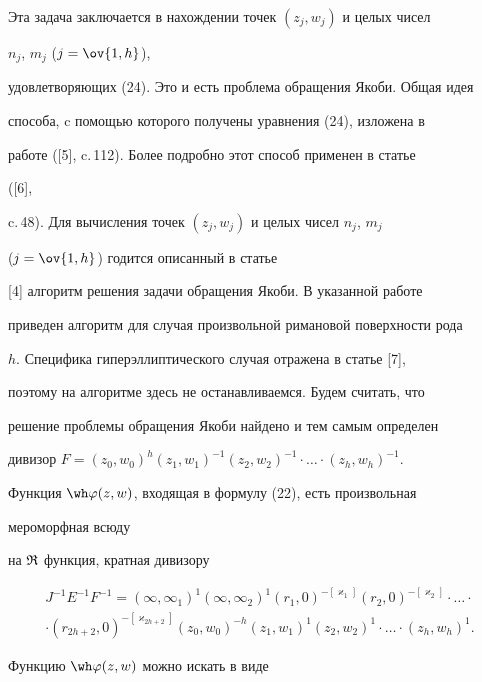 Эта задача заключается в нахождении точек $(z_j,w_j)$ и целых чисел 


$n_j$, $m_j$ ($j=\ov{1,h}$), 


удовлетворяющих (24). Это и есть проблема обращения Якоби. Общая идея 


способа, c помощью которого получены уравнения (24), изложена в 


работе ([5], c.\,112). Более подробно этот способ применен в статье 


([6], 


c.\,48). Для вычисления точек $(z_j,w_j)$ и целых чисел $n_j$, $m_j$ 


($j=\ov{1,h}$) годится описанный в статье 


[4] алгоритм решения задачи обращения Якоби. В указанной работе 


приведен алгоритм для случая произвольной римановой поверхности рода 


$h$. Специфика гиперэллиптического случая отражена в статье [7], 


поэтому на алгоритме здесь не останавливаемся. Будем считать, что 


решение проблемы обращения Якоби найдено и тем самым определен 


дивизор $F=(z_0,w_0)^h(z_1,w_1)^{-1}(z_2,w_2)^{-1}\cdot\dotsc\cdot 


(z_h,w_h)^{-1}$. 


 


Функция $\wh\varphi(z,w)$, входящая в формулу (22), есть произвольная 


мероморфная всюду 


на $\frak R$ функция, кратная дивизору 


\begin{multline*} 


J^{-1}E^{-1}F^{-1}=(\infty,\infty_1)^1 


(\infty,\infty_2)^1(r_1,0)^{-[\varkappa_1]} 


(r_2,0)^{-[\varkappa_2]}\cdot\dotsc\cdot \\


%


\cdot (r_{2h+2},0)^{-[\varkappa_{2h+2}]}(z_0,w_0)^{-h} 


(z_1,w_1)^1(z_2,w_2)^1\cdot\dotsc\cdot(z_h,w_h)^1. 


\end{multline*}  


Функцию $\wh\varphi(z,w)$ можно искать в виде 


